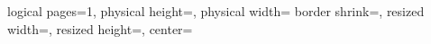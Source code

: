 \renewcommand{\autopstpdfConflictResolutionTemporary}{
\usepackage[
dvips={-o -Ppdf}, 
pspdf={
-dNOSAFER
-dAutoRotatePages=/None %
}, 
pdfcrop={}, 
crop=off%
]{auto-pst-pdf}
}
\usepackage{pgfpages}
{
  \edef\pgfpageoptionheight{\the\paperheight} 
  \edef\pgfpageoptionwidth{\the\paperwidth}
  \edef\pgfpageoptionborder{0pt}
}
{
  \pgfpagesphysicalpageoptions
  {%
    logical pages=1,%
    physical height=\pgfpageoptionheight,%
    physical width=\pgfpageoptionwidth%
  }
  {%
    border shrink=\pgfpageoptionborder,%
    resized width=\pgfphysicalwidth,%
    resized height=\pgfphysicalheight,%
    center=\pgfpoint{.5\pgfphysicalwidth}{.5\pgfphysicalheight}%
  }%
}
